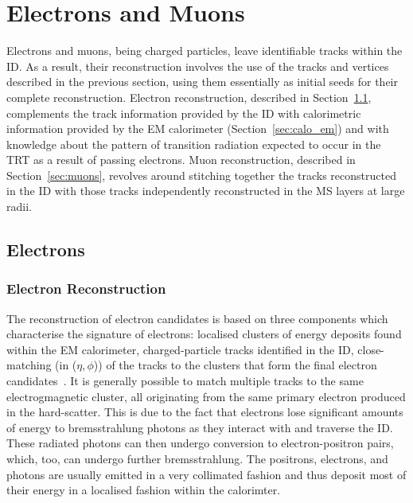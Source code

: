 \section{Electrons and Muons}
\label{sec:leptons}

Electrons and muons, being charged particles, leave identifiable tracks
within the ID.
As a result, their reconstruction involves the use of the tracks and
vertices described in the previous section, using them essentially as initial
seeds for their complete reconstruction.
Electron reconstruction, described in Section~\ref{sec:electrons}, complements the track information provided by the ID
with calorimetric information provided by the EM calorimeter (Section~\ref{sec:calo_em})
and with knowledge about the pattern of transition radiation expected to occur
in the TRT as a result of passing electrons.
Muon reconstruction, described in Section~\ref{sec:muons}, revolves around stitching together the tracks reconstructed
in the ID with those tracks independently reconstructed in the MS layers at large radii.

\subsection{Electrons}
\label{sec:electrons}

\subsubsection{Electron Reconstruction}
\label{sec:electron_reco}

{\color{red}{After 2016 they replaced sliding window algorithm with supercluster-based reco}}

The reconstruction of electron candidates is based on three components which
characterise the signature of electrons: localised clusters of energy
deposits found within the EM calorimeter, charged-particle tracks
identified in the ID, close-matching (in ($\eta,\phi$)) of the tracks to the clusters
that form the final electron candidates~\cite{Aad:2019tso}.
It is generally possible to match multiple tracks to the same electrogmagnetic cluster,
all originating from the same primary electron produced in the hard-scatter.
This is due to the fact that electrons lose significant amounts of energy to bremsstrahlung
photons as they interact with and traverse the ID.
These radiated photons can then undergo conversion to electron-positron pairs,
which, too, can undergo further bremsstrahlung.
The positrons, electrons, and photons are usually emitted in a very collimated fashion
and thus deposit most of their energy in a localised fashion within the calorimter.

